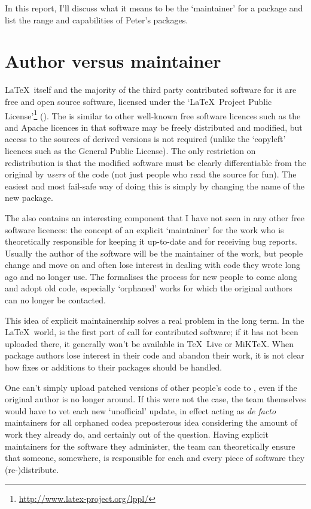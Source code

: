 \documentclass[final]{ltugboat}
\begin{document}
In this report, I'll discuss what it means to be the `maintainer' for a package and list the range and capabilities of Peter's packages.

\section{Author versus maintainer}

\LaTeX\ itself and the majority of the third party contributed software for it are free and open source software, licensed under the `\LaTeX\ Project Public License'\footnote{\url{http://www.latex-project.org/lppl/}} (). The  is similar to other well-known free software licences such as the  and Apache licences in that software may be freely distributed and modified, but access to the sources of derived versions is not required (unlike the `copyleft' licences such as the  General Public License). The only restriction on redistribution is that the modified software must be clearly differentiable from the original by \emph{users} of the code (not just people who read the source for fun). The easiest and most fail-safe way of doing this is simply by changing the name of the new package.

The  also contains an interesting component that I have not seen in any other free software licences: the concept of an explicit `maintainer' for the work who is theoretically responsible for keeping it up-to-date and for receiving bug reports. Usually the author of the software will be the maintainer of the work, but people change and move on and often lose interest in dealing with code they wrote long ago and no longer use. The  formalises the process for new people to come along and adopt old code, especially `orphaned' works for which the original authors can no longer be contacted.

This idea of explicit maintainership solves a real problem in the long term. In the \LaTeX\ world,  is the first port of call for contributed software; if it has not been uploaded there, it generally won't be available in \TeX\ Live or MiK\TeX. When package authors lose interest in their code and abandon their work, it is not clear how fixes or additions to their packages should be handled.

One can't simply upload patched versions of other people's code to , even if the original author is no longer around. If this were not the case, the  team themselves would have to vet each new `unofficial' update, in effect acting as \emph{de facto} maintainers for all orphaned code\Dash a preposterous idea considering the amount of work they already do, and certainly out of the question. Having explicit maintainers for the software they administer, the  team can theoretically ensure that someone, somewhere, is responsible for each and every piece of software they (re-)distribute.
\end{document}

